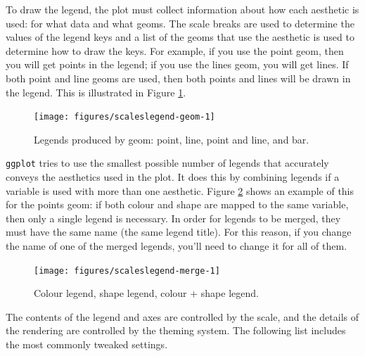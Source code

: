 To draw the legend, the plot must collect information about how each
aesthetic is used: for what data and what geoms. The scale breaks are
used to determine the values of the legend keys and a list of the geoms
that use the aesthetic is used to determine how to draw the keys. For
example, if you use the point geom, then you will get points in the
legend; if you use the lines geom, you will get lines. If both point and
line geoms are used, then both points and lines will be drawn in the
legend. This is illustrated in Figure \ref{fig:legend-geom}.

\begin{figure}

{\centering \texttt{[image: figures/scaleslegend-geom-1]} 

}

\caption{Legends produced by geom: point, line, point and line, and bar.\label{fig:legend-geom}}
\end{figure}

\texttt{ggplot} tries to use the smallest possible number of legends
that accurately conveys the aesthetics used in the plot. It does this by
combining legends if a variable is used with more than one aesthetic.
Figure \ref{fig:legend-merge} shows an example of this for the points
geom: if both colour and shape are mapped to the same variable, then
only a single legend is necessary. In order for legends to be merged,
they must have the same name (the same legend title). For this reason,
if you change the name of one of the merged legends, you'll need to
change it for all of them.

\begin{figure}

{\centering \texttt{[image: figures/scaleslegend-merge-1]} 

}

\caption{Colour legend, shape legend, colour + shape legend.\label{fig:legend-merge}}
\end{figure}

The contents of the legend and axes are controlled by the scale, and the
details of the rendering are controlled by the theming system. The
following list includes the most commonly tweaked settings.

